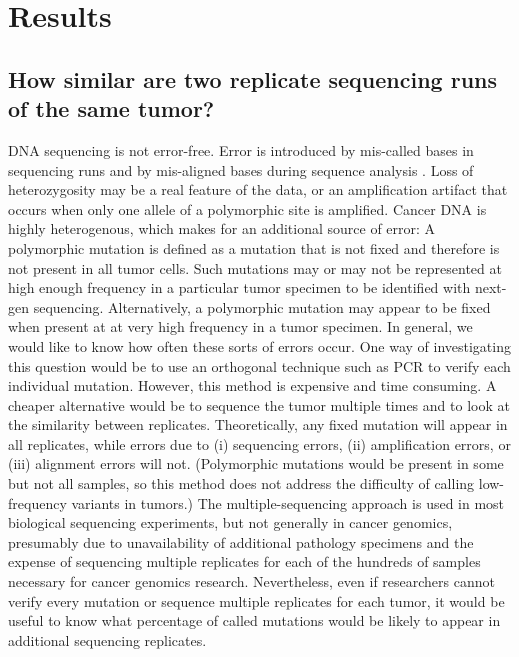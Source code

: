 \documentclass[11 pt]{article} %
\begin{document}
\section*{Results}

\subsection*{How similar are two replicate sequencing runs of the same tumor?}


DNA sequencing is not error-free. Error is introduced by mis-called bases in sequencing runs and by mis-aligned bases during sequence analysis \citep{seqerror}. Loss of heterozygosity may be a real feature of the data, or an amplification artifact that occurs when only one allele of a polymorphic site is amplified. Cancer DNA is highly heterogenous, which makes for an additional source of error: A polymorphic mutation is defined as a mutation that is not fixed and therefore is not present in all tumor cells. Such mutations may or may not be represented at high enough frequency in a particular tumor specimen to be identified with next-gen sequencing. Alternatively, a polymorphic mutation may appear to be fixed when present at at very high frequency in a tumor specimen. In general, we would like to know how often these sorts of errors occur. One way of investigating this question would be to use an orthogonal technique such as PCR to verify each individual mutation. However, this method is expensive and time consuming. A cheaper alternative would be to sequence the tumor multiple times and to look at the similarity between replicates. Theoretically, any fixed mutation will appear in all replicates, while errors due to (i) sequencing errors, (ii) amplification errors, or (iii) alignment errors will not. (Polymorphic mutations would be present in some but not all samples, so this method does not address the difficulty of calling low-frequency variants in tumors.) The multiple-sequencing approach is used in most biological sequencing experiments, but not generally in cancer genomics, presumably due to unavailability of additional pathology specimens and the expense of sequencing multiple replicates for each of the hundreds of samples necessary for cancer genomics research. Nevertheless, even if researchers cannot verify every mutation or sequence multiple replicates for each tumor, it would be useful to know what percentage of called mutations would be likely to appear in additional sequencing replicates.
\end{document}
